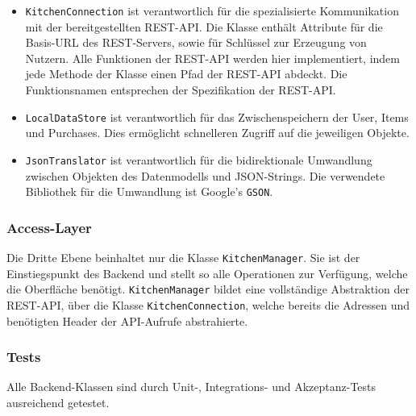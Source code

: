 \begin{itemize}
	\item  \texttt{KitchenConnection} ist verantwortlich für die spezialisierte Kommunikation mit der bereitgestellten REST-API. Die Klasse enthält Attribute für die Basis-URL des REST-Servers, sowie für Schlüssel zur Erzeugung von Nutzern.
	Alle Funktionen der REST-API werden hier implementiert, indem jede Methode der Klasse einen Pfad der REST-API abdeckt.
	Die Funktionsnamen entsprechen der Spezifikation der REST-API\@.

	\item \texttt{LocalDataStore} ist verantwortlich für das Zwischenspeichern der User, Items und Purchases.
	Dies ermöglicht schnelleren Zugriff auf die jeweiligen Objekte.

	\item \texttt{JsonTranslator} ist verantwortlich für die bidirektionale Umwandlung zwischen Objekten des Datenmodells und JSON-Strings.
	Die verwendete Bibliothek für die Umwandlung ist Google's \texttt{GSON}.
\end{itemize}

\subsubsection{Access-Layer} \label{subsubsec:access-layer}

Die Dritte Ebene beinhaltet nur die Klasse \texttt{KitchenManager}.
Sie ist der Einstiegspunkt des Backend und stellt so alle Operationen zur Verfügung, welche die Oberfläche benötigt.
\texttt{KitchenManager} bildet eine vollständige Abstraktion der REST-API, über die Klasse \texttt{KitchenConnection}, welche bereits die Adressen und benötigten Header der API-Aufrufe abstrahierte.


\subsubsection{Tests}

Alle Backend-Klassen sind durch Unit-, Integrations- und Akzeptanz-Tests ausreichend getestet.
